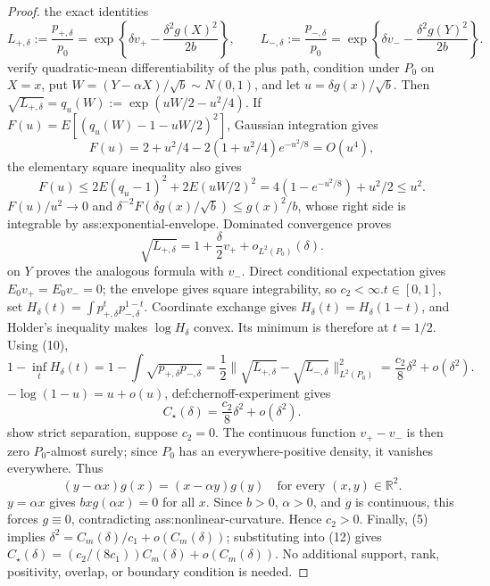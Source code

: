 \documentclass{article}
\begin{document}
\begin{proof}
the exact identities\n\[L_{+,\delta}:=\frac{p_{+,\delta}}{p_0}=\exp\left\{\delta v_+-\frac{\delta^2g(X)^2}{2b}\right\},\qquad L_{-,\delta}:=\frac{p_{-,\delta}}{p_0}=\exp\left\{\delta v_--\frac{\delta^2g(Y)^2}{2b}\right\}.\tag{7}\]\nTo verify quadratic-mean differentiability of the plus path, condition under \(P_0\) on \(X=x\), put \(W=(Y-\alpha X)/\sqrt b\sim N(0,1)\), and let \(u=\delta g(x)/\sqrt b\). Then \(\sqrt{L_{+,\delta}}=q_u(W):=\exp(uW/2-u^2/4)\). If \(F(u)=E[(q_u(W)-1-uW/2)^2]\), Gaussian integration gives\n\[F(u)=2+u^2/4-2(1+u^2/4)e^{-u^2/8}=O(u^4),\tag{8}\]\nand the elementary square inequality also gives\n\[F(u)\le2E(q_u-1)^2+2E(uW/2)^2=4(1-e^{-u^2/8})+u^2/2\le u^2.\tag{9}\]\nTherefore \(F(u)/u^2\to0\) and \(\delta^{-2}F(\delta g(x)/\sqrt b)\le g(x)^2/b\), whose right side is integrable by ass:exponential-envelope. Dominated convergence proves\n\[\sqrt{L_{+,\delta}}=1+\frac{\delta}{2}v_++o_{L^2(P_0)}(\delta).\tag{10}\]\nConditioning on \(Y\) proves the analogous formula with \(v_-\). Direct conditional expectation gives \(E_0v_+=E_0v_-=0\); the envelope gives square integrability, so \(c_2<\infty\).\n\nFor \(t\in[0,1]\), set \(H_\delta(t)=\int p_{+,\delta}^t p_{-,\delta}^{1-t}\). Coordinate exchange gives \(H_\delta(t)=H_\delta(1-t)\), and Holder's inequality makes \(\log H_\delta\) convex. Its minimum is therefore at \(t=1/2\). Using (10),\n\[1-\inf_tH_\delta(t)=1-\int\sqrt{p_{+,\delta}p_{-,\delta}}=\frac12\|\sqrt{L_{+,\delta}}-\sqrt{L_{-,\delta}}\|_{L^2(P_0)}^2=\frac{c_2}{8}\delta^2+o(\delta^2).\tag{11}\]\nBecause \(-\log(1-u)=u+o(u)\), def:chernoff-experiment gives\n\[C_\star(\delta)=\frac{c_2}{8}\delta^2+o(\delta^2).\tag{12}\]\nTo show strict separation, suppose \(c_2=0\). The continuous function \(v_+-v_-\) is then zero \(P_0\)-almost surely; since \(P_0\) has an everywhere-positive density, it vanishes everywhere. Thus\n\[(y-\alpha x)g(x)=(x-\alpha y)g(y)\quad\text{for every }(x,y)\in\mathbb R^2.\tag{13}\]\nPutting \(y=\alpha x\) gives \(bxg(\alpha x)=0\) for all \(x\). Since \(b>0\), \(\alpha>0\), and \(g\) is continuous, this forces \(g\equiv0\), contradicting ass:nonlinear-curvature. Hence \(c_2>0\). Finally, (5) implies \(\delta^2=C_m(\delta)/c_1+o(C_m(\delta))\); substituting into (12) gives \(C_\star(\delta)=(c_2/(8c_1))C_m(\delta)+o(C_m(\delta))\). No additional support, rank, positivity, overlap, or boundary condition is needed.
\end{proof}
\end{document}

